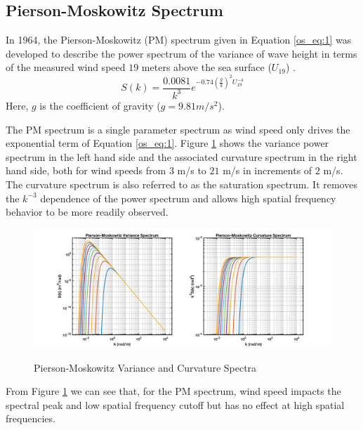 \subsection{Pierson-Moskowitz Spectrum}
In 1964, the Pierson-Moskowitz (PM) spectrum given in Equation \ref{os_eq:1} was developed to describe the power spectrum of the variance of wave height in terms of the measured wind speed $19$ meters above the sea surface ($U_{19}$) \cite{michel_sea_spectra}. 
 \begin{equation}
S(k) = \frac{0.0081}{k^3}e^{-0.74\left(\frac{g}{k}\right)^2U_{19}^{-4}}
\label{os_eq:1}
\end{equation}
 \renewcommand{\baselinestretch}{2} \small\normalsize
Here, $g$ is the coefficient of gravity ($g = 9.81 m/s^2$). 
 
The PM spectrum is a single parameter spectrum as wind speed only drives the exponential term of Equation \ref{os_eq:1}. Figure \ref{os_fig:1} shows the variance power spectrum in the left hand side and the associated curvature spectrum in the right hand side, both for wind speeds from $3$ m/s to $21$ m/s in increments of $2$ m/s. The curvature spectrum is also referred to as the saturation spectrum. It removes the $k^{-3}$ dependence of the power spectrum and allows high spatial frequency behavior to be more readily observed.
 
 \begin{figure}[H]
  \begin{center}
\includegraphics[width=6in]{../media/Ocean_Surface/PM_variance_curvature_spectrum.png}
  \end{center}
  \renewcommand{\baselinestretch}{1} \small\normalsize
  \begin{quote}
    \caption[Pierson-Moskowitz Variance and Curvature Spectra]{Pierson-Moskowitz Variance and Curvature Spectra\label{os_fig:1}}
  \end{quote}
\end{figure}
 \renewcommand{\baselinestretch}{2} \small\normalsize
From Figure \ref{os_fig:1} we can see that, for the PM spectrum, wind speed impacts the spectral peak and low spatial frequency cutoff but has no effect at high spatial frequencies.
 
